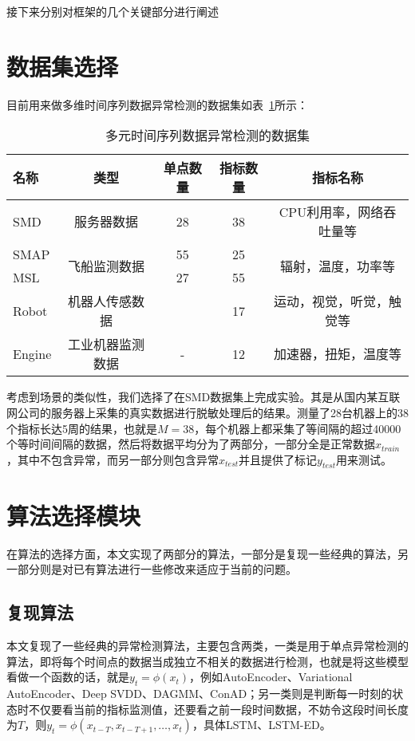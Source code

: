 接下来分别对框架的几个关键部分进行阐述
\section{数据集选择}
目前用来做多维时间序列数据异常检测的数据集如表~\ref{tab:dataset}所示：

\begin{table}[htbp]
  \centering
  \begin{tabular}{lcccc}
    \toprule
    名称 & 类型 & 单点数量 & 指标数量  & 指标名称 \\
    \midrule
    SMD\cite{su2019robust} & 服务器数据 & 28 & 38 & CPU利用率，网络吞吐量等\\
    SMAP\cite{DBLP:conf/kdd/HundmanCLCS18} & \multirow{2}{*}{飞船监测数据} & 55 & 25 & \multirow{2}{*}{辐射，温度，功率等}\\
    MSL\cite{DBLP:conf/kdd/HundmanCLCS18} &  & 27 & 55 &  \\
    Robot\cite{park2018multimodal} & 机器人传感数据 & \approx 39 & 17 & 运动，视觉，听觉，触觉等\\
    Engine\cite{malhotra2016lstm} &工业机器监测数据 & - & 12 & 加速器，扭矩，温度等\\
    \bottomrule
  \end{tabular}
  \caption{多元时间序列数据异常检测的数据集\cite{su2019robust}}
  \label{tab:dataset}
\end{table}

考虑到场景的类似性，我们选择了在SMD\cite{su2019robust}数据集上完成实验。其是从国内某互联网公司的服务器上采集的真实数据进行脱敏处理后的结果。测量了28台机器上的38个指标长达5周的结果，也就是$M=38$，每个机器上都采集了等间隔的超过40000个等时间间隔的数据，然后将数据平均分为了两部分，一部分全是正常数据$x_{train}$，其中不包含异常，而另一部分则包含异常$x_{test}$并且提供了标记$y_{test}$用来测试。

\section{算法选择模块}
在算法的选择方面，本文实现了两部分的算法，一部分是复现一些经典的算法，另一部分则是对已有算法进行一些修改来适应于当前的问题。
\subsection{复现算法}
本文复现了一些经典的异常检测算法，主要包含两类，一类是用于单点异常检测的算法，即将每个时间点的数据当成独立不相关的数据进行检测，也就是将这些模型看做一个函数的话，就是$y_t = \phi (x_t)$，例如AutoEncoder、Variational AutoEncoder\cite{an2015variational}、Deep SVDD\cite{ruff2018deep}、DAGMM\cite{zong2018deep}、ConAD\cite{nguyen2018anomaly}；另一类则是判断每一时刻的状态时不仅要看当前的指标监测值，还要看之前一段时间数据，不妨令这段时间长度为$T$，则$y_t = \phi(x_{t-T},x_{t-T+1},\dots,x_{t})$，具体LSTM、LSTM-ED\cite{malhotra2016lstm}。
